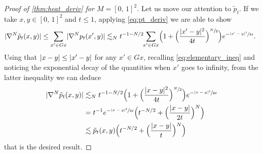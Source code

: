 \documentclass[JEP,XML,SOM,Unicode]{cedram}
\theoremstyle{plain}
\theoremstyle{definition}
\numberwithin{equation}{section}
\newcommand{\cc}[2]{\ensuremath{\left[#1,\,#2\right]}}
\newcommand{\fullstop}{\ensuremath{\text{. }}}
\DeclarePairedDelimiter\abs{\lvert}{\rvert}
\begin{document}
\begin{proof}[Proof of \cref{thm:heat_deriv} for $M=\cc01^2$]
Let us move our attention to $\tilde p_t$.
If we take $x,y\in\cc01^2$ and $t\le 1$, applying \cref{eq:pt_deriv} we are able to show
\begin{equation*}
\abs{\nabla^N \tilde p_t(x, y)} \le \sum_{x'\in Gx} \abs{\nabla^N p_t(x', y)}
\lesssim_N t^{-1-N/2}\hspace*{-3pt}\sum_{x'\in Gx} \Bigl(1+ \Bigl(\frac{\abs{x'-y}^2}{4t}\Bigr)^{\sfrac N2}\Bigr)
e^{-\sfrac{\abs{x'-y}^2}{4t}} \fullstop
\end{equation*}
Using that $\abs{x-y}\le \abs{x'-y}$ for any $x'\in Gx$, recalling \cref{eq:elementary_ineq} and
noticing the exponential decay of the quantities when $x'$ goes to infinity, from the latter inequality
we can deduce
\begin{align*}
\abs{\nabla^N \tilde p_t(x, y)}
&\lesssim_N t^{-1-N/2}\Bigl(1+ \Bigl(\frac{\abs{x-y}^2}{4t}\Bigr)^{\sfrac N2}\Bigr)
		e^{-\sfrac{\abs{x-y}^2}{4t}} \\
&= t^{-1}e^{-\sfrac{\abs{x-y}^2}{4t}}
		\Bigl(t^{-N/2}+\Bigl(\frac{\abs{x-y}}{2t}\Bigr)^N\Bigr) \\
&\lesssim \tilde p_t(x, y)
	 \Bigl(t^{-N/2}+\Bigl(\frac{\abs{x-y}}t\Bigr)^N\Bigr)
\end{align*}
that is the desired result.
\end{proof}




\end{document}
